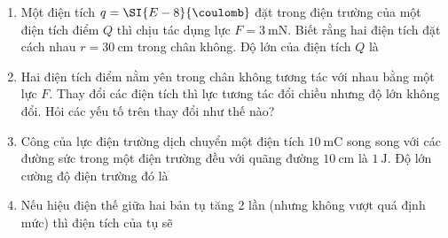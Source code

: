 \begin{enumerate}[label=\bfseries Câu \arabic*:]
\item Một điện tích $q=\SI{E-8}{\coulomb}$ đặt trong điện trường của một điện tích điểm $Q$ thì chịu tác dụng lực $F=\SI{3}{\milli\newton}$. Biết rằng hai điện tích đặt cách nhau $r=\SI{30}{\centi\meter}$ trong chân không. Độ lớn của điện tích $Q$ là

\item Hai điện tích điểm nằm yên trong chân không tương tác với nhau bằng một lực $F$. Thay đổi các điện tích thì lực tương tác đổi chiều nhưng độ lớn không đổi. Hỏi các yếu tố trên thay đổi như thế nào?

\item Công của lực điện trường dịch chuyển một điện tích $\SI{10}{\milli\coulomb}$ song song với các đường sức trong một điện trường đều với quãng đường $\SI{10}{\centi\meter}$ là $\SI{1}{\joule}$. Độ lớn cường độ điện trường đó là

\item Nếu hiệu điện thế giữa hai bản tụ tăng 2 lần (nhưng không vượt quá định mức) thì điện tích của tụ sẽ


\end{enumerate}
